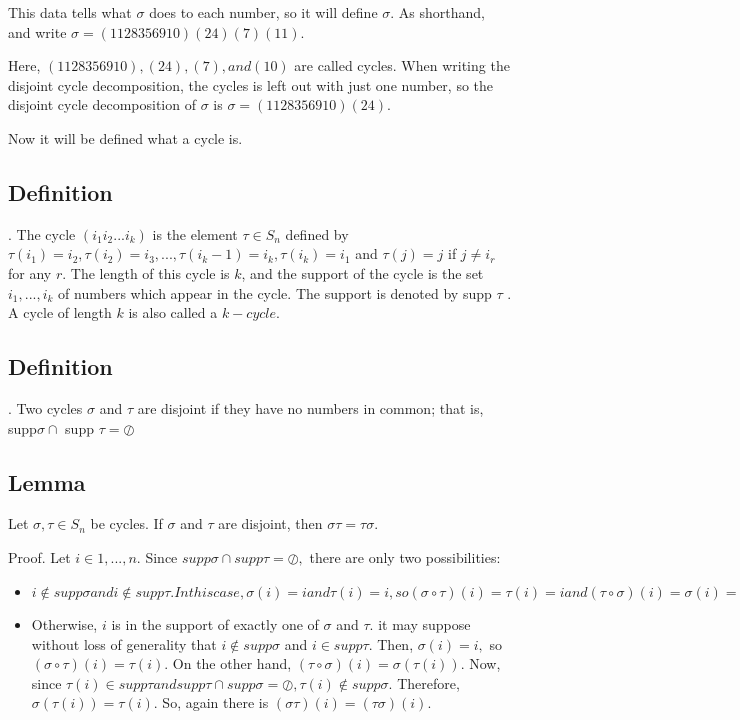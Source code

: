 This data tells what $\sigma$ does to each number, so it will define $\sigma$. As shorthand, and write
$\sigma = (1 12 8 3 5 6 9 10) (2 4) (7) (11).$

Here, $(1 12 8 3 5 6 9 10), (2 4), (7), and (10)$ are called cycles. When writing the disjoint cycle decomposition,
the cycles is left out with just one number, so the disjoint cycle decomposition of $\sigma$ is
$\sigma = (1 12 8 3 5 6 9 10) (2 4).$ 

Now it will be defined what a cycle is.

\subsection{Definition}. The cycle $(i_1  i_2 ... i_k )$ is the element $\tau \in S_n$ defined by $\tau(i_1 ) = i_2 , \tau(i_2 ) = i_3 , . . . , \tau(i_k  -1) =
i_k , \tau(i_k ) = i_1 $ and $\tau(j) = j$ if $j \neq i_r $ for any $r$. The length of this cycle is $k$, and the support of the cycle
is the set ${i_1 , . . . , i_k }$ of numbers which appear in the cycle. The support is denoted by supp $\tau$ . A cycle of
length $k$ is also called a $k-cycle$.

\subsection{Definition}. Two cycles $\sigma$ and $\tau$ are disjoint if they have no numbers in common; that is, supp$\sigma \cap$ 
supp $\tau = \oslash$

\subsection{Lemma} Let $\sigma,\tau\in S_n$ be cycles. If $\sigma$ and $\tau$ are disjoint, then $\sigma\tau = \tau\sigma$.

Proof. Let $i\in{1, . . . , n}.$ Since $supp \sigma\cap supp \tau = \oslash,$ there are only two possibilities:
\begin{itemize}
\item $i \notin supp \sigma and i \notin supp \tau. In this case, \sigma(i) = i and \tau(i) = i, so (\sigma \circ \tau)(i) =\tau(i) = i and
(\tau \circ \sigma)(i) = \sigma(i) = i.$

\item Otherwise, $i$ is in the support of exactly one of $\sigma$ and $\tau$. it may suppose without loss of generality that
$i \notin supp \sigma$ and $i \in supp \tau.$ Then, $\sigma(i) = i,$ so $(\sigma \circ \tau)(i) = \tau(i).$ On the other hand, $(\tau \circ \sigma)(i) = \sigma(\tau(i)).$
Now, since $\tau(i) \in supp \tau and supp \tau \cap supp \sigma = \oslash, \tau(i) \notin supp \sigma.$ Therefore, $\sigma(\tau(i)) = \tau(i).$ So,
again there is $(\sigma\tau)(i) = (\tau\sigma)(i).$
\end{itemize}

